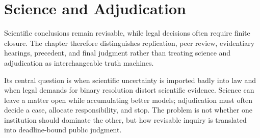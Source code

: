 
\chapter{Science and Adjudication}
\label{ch:ch055}

Scientific conclusions remain revisable, while legal decisions often require finite closure. The chapter therefore distinguishes replication, peer review, evidentiary hearings, precedent, and final judgment rather than treating science and adjudication as interchangeable truth machines.

Its central question is when scientific uncertainty is imported badly into law and when legal demands for binary resolution distort scientific evidence. Science can leave a matter open while accumulating better models; adjudication must often decide a case, allocate responsibility, and stop. The problem is not whether one institution should dominate the other, but how revisable inquiry is translated into deadline-bound public judgment.
